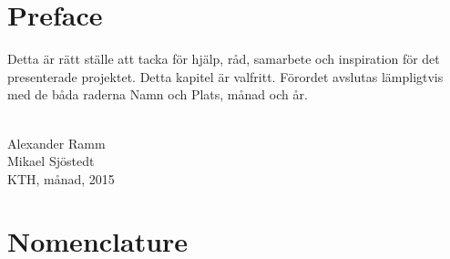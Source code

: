 \documentclass[a4paper,11pt]{kth-mag}
\begin{document}
\chapter*{Preface}
Detta är rätt ställe att tacka för hjälp, råd, samarbete och inspiration för det presenterade projektet. Detta kapitel är valfritt. 
Förordet avslutas lämpligtvis med de båda raderna Namn och Plats, månad och år. \\ \\
\begin{flushright}Alexander Ramm \\Mikael Sjöstedt \\ KTH, månad, 2015 \end{flushright}




\cleardoublepage
{}
\printindex
\tableofcontents*

\cleardoublepage
\chapter*{Nomenclature}
\end{document}
